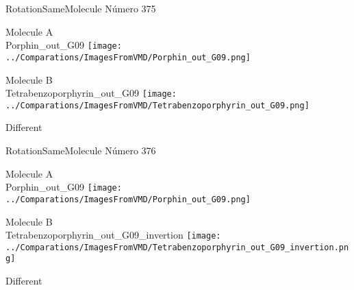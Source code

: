  \newpage

\vtab[-2cm]
\begin{center}
{\large RotationSameMolecule \tab Número 375}
\end{center}
\begin{multicols}{2}
\begin{center}
Molecule A \\ 
Porphin\_out\_G09
\texttt{[image: ../Comparations/ImagesFromVMD/Porphin\_out\_G09.png]}
\\
\vtab

\columnbreak
Molecule B \\ 
Tetrabenzoporphyrin\_out\_G09
\texttt{[image: ../Comparations/ImagesFromVMD/Tetrabenzoporphyrin\_out\_G09.png]}
\\
\vtab


\end{center}
\end{multicols}
\begin{center}
\vtab
\vtab
\textcolor{NavyBlue}{\Large Different}
\end{center}

 \newpage

\vtab[-2cm]
\begin{center}
{\large RotationSameMolecule \tab Número 376}
\end{center}
\begin{multicols}{2}
\begin{center}
Molecule A \\ 
Porphin\_out\_G09
\texttt{[image: ../Comparations/ImagesFromVMD/Porphin\_out\_G09.png]}
\\
\vtab

\columnbreak
Molecule B \\ 
Tetrabenzoporphyrin\_out\_G09\_invertion
\texttt{[image: ../Comparations/ImagesFromVMD/Tetrabenzoporphyrin\_out\_G09\_invertion.png]}
\\
\vtab


\end{center}
\end{multicols}
\begin{center}
\vtab
\vtab
\textcolor{NavyBlue}{\Large Different}
\end{center}

 \newpage

